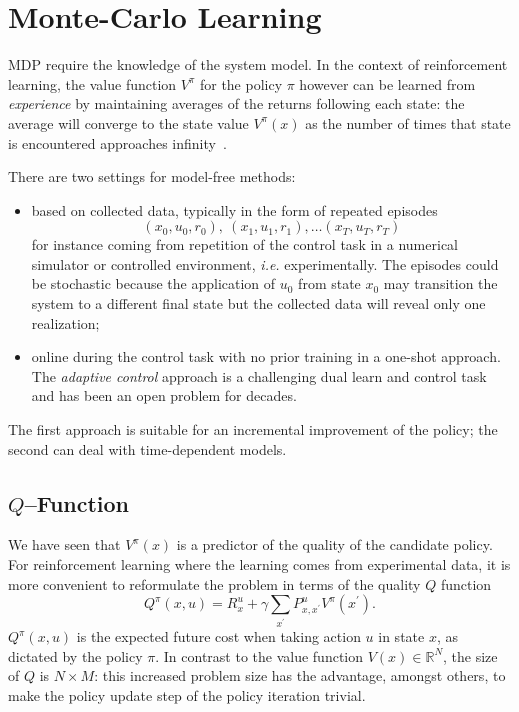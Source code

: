 \chapter{Monte-Carlo Learning}
\label{chap:mc-learning}

MDP require the knowledge of the system model. In the context of reinforcement learning, the value function $V^\pi$ for the policy $\pi$ however can be learned from \emph{experience} by maintaining averages of the returns following each state: the average will converge to the state value $V^\pi(x)$ as the number of times that state is encountered approaches infinity~\cite[Sect.~3.5]{reinforcement-learning-sutton-barto}.

There are two settings for model-free methods:
\begin{itemize}
\item based on collected data, typically in the form of repeated episodes
  \begin{equation*}
    (x_0,u_0,r_0),\ (x_1,u_1,r_1),\ldots (x_T,u_T,r_T)
  \end{equation*}
  for instance coming from repetition of the control task in a numerical simulator or controlled environment, \textit{i.e.} experimentally. The episodes could be stochastic because the application of $u_0$ from state $x_0$ may transition the system to a different final state but the collected data will reveal only one realization;
\item online during the control task with no prior training in a one-shot approach. The \emph{adaptive control} approach is a challenging dual learn and control task and has been an open problem for decades.
\end{itemize}
The first approach is suitable for an incremental improvement of the policy; the second can deal with time-dependent models.

\section{$Q$--Function}
\label{sec:Q-function}

We have seen that $V^\pi(x)$ is a predictor of the quality of the candidate policy. For reinforcement learning where the learning comes from experimental data, it is more convenient to reformulate the problem in terms of the quality $Q$ function
\begin{equation}
  \label{eq:q-function-definition}
  Q^\pi(x,u) = R_x^u + \gamma \sum_{x^\prime}P_{x,x^\prime}^u V^\pi (x^\prime).
\end{equation}
$Q^\pi(x,u)$ is the expected future cost when taking action $u$ in state $x$, as dictated by the policy $\pi$. In contrast to the value function $V(x)\in \mathbb{R}^N$, the size of $Q$ is $N\times M$: this increased problem size has the advantage, amongst others, to make the policy update step of the policy iteration trivial.

